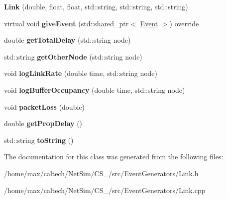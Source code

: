 \begin{DoxyCompactItemize}
\item 
\hypertarget{classLink_af0a6ae4d9767bacfb371f52a30441e64}{{\bfseries \-Link} (double, float, float, std\-::string, std\-::string, std\-::string)}\label{classLink_af0a6ae4d9767bacfb371f52a30441e64}

\item 
\hypertarget{classLink_abd9466c4c2097329f4affd9b2eafbd7a}{virtual void {\bfseries give\-Event} (std\-::shared\-\_\-ptr$<$ \hyperlink{classEvent}{\-Event} $>$) override}\label{classLink_abd9466c4c2097329f4affd9b2eafbd7a}

\item 
\hypertarget{classLink_a19a132f87f8028ccd5af2503084aac64}{double {\bfseries get\-Total\-Delay} (std\-::string node)}\label{classLink_a19a132f87f8028ccd5af2503084aac64}

\item 
\hypertarget{classLink_aaa4e4c72a6384f118846765c296e5634}{std\-::string {\bfseries get\-Other\-Node} (std\-::string node)}\label{classLink_aaa4e4c72a6384f118846765c296e5634}

\item 
\hypertarget{classLink_a0e1ec62377102139e4acc14392e96c12}{void {\bfseries log\-Link\-Rate} (double time, std\-::string node)}\label{classLink_a0e1ec62377102139e4acc14392e96c12}

\item 
\hypertarget{classLink_af07994bcf90cd63abe9edab218a5d752}{void {\bfseries log\-Buffer\-Occupancy} (double time, std\-::string node)}\label{classLink_af07994bcf90cd63abe9edab218a5d752}

\item 
\hypertarget{classLink_a94f034f0b3ebfbf4c08bcae80a5d9904}{void {\bfseries packet\-Loss} (double)}\label{classLink_a94f034f0b3ebfbf4c08bcae80a5d9904}

\item 
\hypertarget{classLink_a6349999e40910091ecea77e2a366aa46}{double {\bfseries get\-Prop\-Delay} ()}\label{classLink_a6349999e40910091ecea77e2a366aa46}

\item 
\hypertarget{classLink_a8c768141c7ebf3b852bf978757f903be}{std\-::string {\bfseries to\-String} ()}\label{classLink_a8c768141c7ebf3b852bf978757f903be}

\end{DoxyCompactItemize}


\-The documentation for this class was generated from the following files\-:\begin{DoxyCompactItemize}
\item 
/home/max/caltech/\-Net\-Sim/\-C\-S\-\_/src/\-Event\-Generators/\-Link.\-h\item 
/home/max/caltech/\-Net\-Sim/\-C\-S\-\_/src/\-Event\-Generators/\-Link.\-cpp\end{DoxyCompactItemize}
